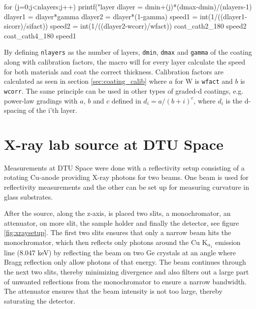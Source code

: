\begin{verbcode}
  for (j=0;j<nlayers;j++){
    printf("\nStarting layer %
    dlayer = dmin+(j)*(dmax-dmin)/(nlayers-1)
    dlayer1 = dlayer*gamma
    dlayer2 = dlayer*(1-gamma)
    speed1 = int(1/((dlayer1-sicorr)/sifact))
    speed2 = int(1/((dlayer2-wcorr)/wfact))
    coat_cath2_180 speed2
    coat_cath4_180 speed1
    }
\end{verbcode}

By defining \verb|nlayers| as the number of layers, \verb|dmin|, \verb|dmax| and \verb|gamma| of the coating along with calibration factors, the macro will for every layer calculate the speed for both materials and coat the correct thickness. Calibration factors are calculated as seen in section \ref{sec:coating_calib} where $a$ for W is \verb|wfact| and $b$ is \verb|wcorr|. The same principle can be used in other types of graded-d coatings, e.g. power-law gradings with $a$, $b$ and $c$ defined in $d_i = a/(b+i)^c$, where $d_i$ is the d-spacing of the i'th layer.

\section{X-ray lab source at DTU Space}
Measurements at DTU Space were done with a reflectivity setup consisting of a rotating Cu-anode providing X-ray photons for two beams. One beam is used for reflectivity measurements and the other can be set up for measuring curvature in glass substrates.

After the source, along the z-axis, is placed two slits, a monochromator, an attenuator, on more slit, the sample holder and finally the detector, see figure \ref{fig:xraysetup}. The first two slits ensures that only a narrow beam hits the monochromator, which then reflects only photons around the Cu K$_{\alpha_1}$ emission line (8.047 keV) by reflecting the beam on two Ge crystals at an angle where Bragg reflection only allow photons of that energy. The beam continues through the next two slits, thereby minimizing divergence and also filters out a large part of unwanted reflections from the monochromator to ensure a narrow bandwidth. The attenuator ensures that the beam intensity is not too large, thereby saturating the detector.

